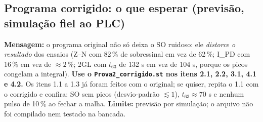 \documentclass[11pt,a4paper]{article}
\begin{document}
\subsection{Programa corrigido: o que esperar (previsão, simulação fiel ao PLC)}
\begin{center}\small{}\end{center}
\textbf{Mensagem:} o programa original não só deixa o SO ruidoso: ele \emph{distorce o resultado} dos ensaios (Z--N com 82\,\% de sobressinal em vez de 62\,\%; I\_PD com 16\,\% em vez de $\approx2\,\%$; 2GL com $t_{63}$ de 132 s em vez de 104 s, porque os picos congelam a integral). \textbf{Use o \texttt{Prova2\_corrigido.st} nos itens 2.1, 2.2, 3.1, 4.1 e 4.2.} Os itens 1.1 a 1.3 já foram feitos com o original; se quiser, repita o 1.1 com o corrigido e confira: SO sem picos (desvio-padrão $\lesssim1$), $t_{63}\approx70$ s e nenhum pulso de 10\,\% ao fechar a malha. \textbf{Limite:} previsão por simulação; o arquivo não foi compilado nem testado na bancada.
\end{document}
